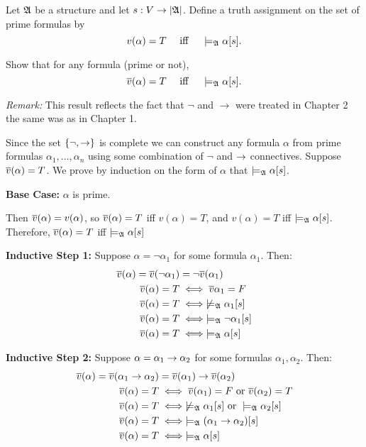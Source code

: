 \begin{problem}[3]
  \begin{enumalph}
    \item Let $\mathfrak{A}$ be a structure and let $s : V \to \lvert\mathfrak{A}\rvert$.
    Define a truth assignment on the set of prime formulas by
    \[
      v(\alpha) = T \quad \text{ iff } \quad \models_{\mathfrak{A}} \alpha[s].
    \]

    \step
    Show that for any formula (prime or not),
    \[
      \overline{v}(\alpha) = T \quad \text{ iff } \quad \models_{\mathfrak{A}} \alpha[s].
    \]

    \step
    \emph{Remark: } This result reflects the fact that $\lnot$ and $\to$ were treated
    in Chapter 2 the same was as in Chapter 1.

    \begin{Answer}
      Since the set $\left\{\lnot, \rightarrow\right\}$ is complete
      we can construct any formula $\alpha$ from prime formulas $\alpha_1, \ldots, \alpha_n$
      using some combination of $\lnot$ and $\rightarrow$ connectives.
      Suppose $\overline{v}(\alpha) = T$.
      We prove by induction on the form of $\alpha$ that $\models_{\mathfrak{A}} \alpha[s]$.
      
      \step
      \textbf{Base Case:} $\alpha$ is prime.

      \step
      Then $\overline{v}(\alpha) = v(\alpha)$, so $\overline{v}(\alpha) = T$ iff $v(\alpha) = T$,
      and $v(\alpha) = T$ iff $\models_{\mathfrak{A}} \alpha[s]$.\\
      Therefore, $\overline{v}(\alpha) = T$ iff $\models_{\mathfrak{A}} \alpha[s]$

      \step
      \textbf{Inductive Step 1:} Suppose $\alpha = \lnot \alpha_1$ for some formula $\alpha_1$.
      Then:
      \begin{align*}
        \overline{v}(\alpha) = \overline{v}(\lnot \alpha_1) &= \lnot \overline{v}(\alpha_1) \\
        \overline{v}(\alpha) = T &\;\Longleftrightarrow\; \overline{v}{\alpha_1} = F  \\
        \overline{v}(\alpha) = T &\;\Longleftrightarrow\; \not \models_{\mathfrak{A}} \alpha_1[s] \\
        \overline{v}(\alpha) = T &\;\Longleftrightarrow\; \models_{\mathfrak{A}} \lnot \alpha_1[s] \\
        \overline{v}(\alpha) = T &\;\Longleftrightarrow\; \models_{\mathfrak{A}} \alpha[s]
      \end{align*}

      \step
      \textbf{Inductive Step 2:} Suppose $\alpha = \alpha_1 \rightarrow \alpha_2$ for some formulas $\alpha_1, \alpha_2$.
      Then:
      \begin{align*}
        \overline{v}(\alpha) = \overline{v}(\alpha_1 \rightarrow \alpha_2) &= \overline{v}(\alpha_1) \rightarrow \overline{v}(\alpha_2) \\
        \overline{v}(\alpha) = T &\;\Longleftrightarrow\; \overline{v}(\alpha_1) = F \text{ or } \overline{v}(\alpha_2) = T \\
        \overline{v}(\alpha) = T &\;\Longleftrightarrow\; \not \models_{\mathfrak{A}} \alpha_1[s] \text{ or } \models_{\mathfrak{A}} \alpha_2[s] \\
        \overline{v}(\alpha) = T &\;\Longleftrightarrow\; \models_{\mathfrak{A}} (\alpha_1 \rightarrow \alpha_2) [s] \\
        \overline{v}(\alpha) = T &\;\Longleftrightarrow\; \models_{\mathfrak{A}} \alpha[s]
      \end{align*}


\end{Answer}
\end{enumalph}
\end{problem}
